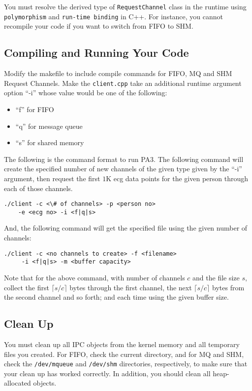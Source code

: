 \documentclass[12pt]{extarticle}
\begin{document}
You must resolve the derived type of \texttt{RequestChannel} class in the runtime using \texttt{polymorphism} and \texttt{run-time binding} in C++. For instance, you cannot recompile your code if you want to switch from FIFO to SHM.

\subsection{Compiling and Running Your Code}
Modify the makefile to include compile commands for FIFO, MQ and SHM Request Channels. Make the \texttt{client.cpp} take an additional runtime argument option ``-i'' whose value would be one of the following:
\begin{itemize}
	\item ``f'' for FIFO
	\item ``q'' for message queue
	\item ``s'' for shared memory
\end{itemize}

The following is the command format to run PA3. The following command will create the specified number of new channels of the given type given by the ``-i'' argument, then request the first $1$K ecg data points for the given person through each of those channels.
\begin{lstlisting}[style=DOS]
    ./client -c <\# of channels> -p <person no>
    -e <ecg no> -i <f|q|s>
\end{lstlisting}

And, the following command will get the specified file using the given number of channels:
\begin{lstlisting}[style=DOS]
    ./client -c <no channels to create> -f <filename>
     -i <f|q|s> -m <buffer capacity>
\end{lstlisting}
Note that for the above command, with number of channels $c$ and the file size $s$, collect the first $\lceil s/c \rceil$ bytes through the first channel, the next $\lceil s/c \rceil$ bytes from the second channel and so forth; and each time using the given buffer size.

\subsection{Clean Up}
You must clean up all IPC objects from the kernel memory and all temporary files you created. For FIFO, check the current directory, and for MQ and SHM, check the \texttt{/dev/mqueue} and \texttt{/dev/shm} directories, respectively, to make sure that your clean up has worked correctly. In addition, you should clean all heap-allocated objects. 
\end{document}
